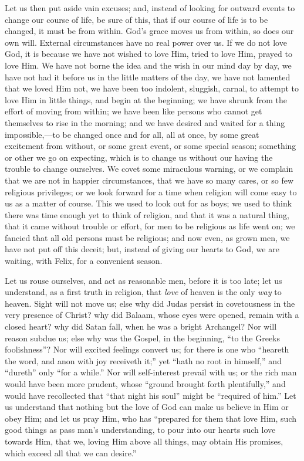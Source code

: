 Let us then put aside vain excuses; and, instead of looking for
outward events to change our course of life, be sure of this, that if
our course of life is to be changed, it must be from within. God's
grace moves us from within, so does our own will. External
circumstances have no real power over us. If we do not love God, it is
because we have not wished to love Him, tried to love Him, prayed to
love Him. We have not borne the idea and the wish in our mind day by
day, we have not had it before us in the little matters of the day, we
have not lamented that we loved Him not, we have been too indolent,
sluggish, carnal, to attempt to love Him in little things, and begin
at the beginning; we have shrunk from the effort of moving from
within; we have been like persons who cannot get themselves to rise in
the morning; and we have desired and waited for a thing impossible,—to
be changed once and for all, all at once, by some great excitement
from without, or some great event, or some special season; something
or other we go on expecting, which is to change us without our having
the trouble to change ourselves. We covet some miraculous warning, or
we complain that we are not in happier circumstances, that we have so
many cares, or so few religious privileges; or we look forward for a
time when religion will come easy to us as a matter of course. This we
used to look out for as boys; we used to think there was time enough
yet to think of religion, and that it was a natural thing, that it
came without trouble or effort, for men to be religious as life went
on; we fancied that all old persons must be religious; and now even,
as grown men, we have not put off this deceit; but, instead of giving
our hearts to God, we are waiting, with Felix, for a convenient
season.

Let us rouse ourselves, and act as reasonable men, before it is too
late; let us understand, as a first truth in religion, that \emph{love}
of heaven is the only \emph{way} to heaven. Sight will not move us;
else why did Judas persist in covetousness in the very presence of
Christ? why did Balaam, whose eyes were opened, remain with a closed
heart? why did Satan fall, when he was a bright Archangel? Nor will
reason subdue us; else why was the Gospel, in the beginning, ``to
the Greeks foolishness''? Nor will excited feelings convert us;
for there is one who ``heareth the word, and anon with joy
receiveth it;'' yet ``hath no root in himself,'' and
``dureth'' only ``for a while.'' Nor will
self-interest prevail with us; or the rich man would have been more
prudent, whose ``ground brought forth plentifully,'' and would
have recollected that ``that night his soul'' might be
``required of him.'' Let us understand that nothing but the
love of God can make us believe in Him or obey Him; and let us pray
Him, who has ``prepared for them that love Him, such good things
as pass man's understanding, to pour into our hearts such love towards
Him, that we, loving Him above all things, may obtain His promises,
which exceed all that we can desire.''

